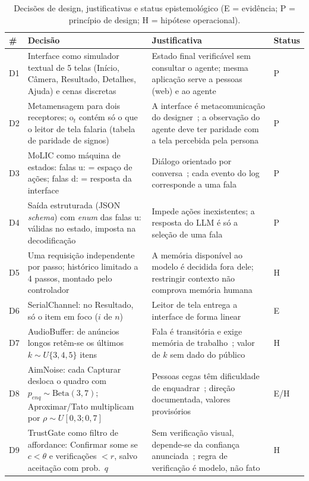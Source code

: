 \documentclass[conference]{IEEEtran}
\begin{document}
\begin{table}[t]
\caption{Decisões de design, justificativas e status epistemológico (E = evidência; P = princípio de design; H = hipótese operacional).}
\label{tab:decisoes}
\centering\footnotesize
\begin{tabularx}{\textwidth}{>{\raggedright\arraybackslash}p{0.4cm} >{\raggedright\arraybackslash}p{4.6cm} X >{\centering\arraybackslash}p{0.7cm}}
\toprule
\# & Decisão & Justificativa & Status\\
\midrule
D1 & Interface como simulador textual de 5 telas (Início, Câmera, Resultado, Detalhes, Ajuda) e cenas discretas & Estado final verificável sem consultar o agente; mesma aplicação serve a pessoas (web) e ao agente & P\\
D2 & Metamensagem para dois receptores; o$_t$ contém só o que o leitor de tela falaria (tabela de paridade de signos) & A interface é metacomunicação do designer~\cite{kammersgaard}; a observação do agente deve ter paridade com a tela percebida pela persona & P\\
D3 & MoLIC como máquina de estados: falas u: = espaço de ações; falas d: = resposta da interface & Diálogo orientado por conversa~\cite{molic}; cada evento do log corresponde a uma fala & P\\
D4 & Saída estruturada (JSON \emph{schema}) com \emph{enum} das falas u: válidas no estado, imposta na decodificação & Impede ações inexistentes; a resposta do LLM é só a seleção de uma fala & P\\
D5 & Uma requisição independente por passo; histórico limitado a 4 passos, montado pelo controlador & A memória disponível ao modelo é decidida fora dele; restringir contexto não comprova memória humana & H\\
D6 & SerialChannel: no Resultado, só o item em foco ($i$ de $n$) & Leitor de tela entrega a interface de forma linear~\cite{tan2024} & E\\
D7 & AudioBuffer: de anúncios longos retêm-se os últimos $k\sim U\{3,4,5\}$ itens & Fala é transitória e exige memória de trabalho~\cite{dix}; valor de $k$ sem dado do público & H\\
D8 & AimNoise: cada Capturar desloca o quadro com $p_{enq}\sim\text{Beta}(3,7)$; Aproximar/Tato multiplicam por $\rho\sim U[0{,}3;0{,}7]$ & Pessoas cegas têm dificuldade de enquadrar~\cite{manduchi}; direção documentada, valores provisórios & E/H\\
D9 & TrustGate como filtro de affordance: Confirmar some se $c<\theta$ e verificações $<r$, salvo aceitação com prob.\ $q$ & Sem verificação visual, depende-se da confiança anunciada~\cite{modelagem}; regra de verificação é modelo, não fato & H\\

\end{tabularx}
\end{table}
\end{document}
